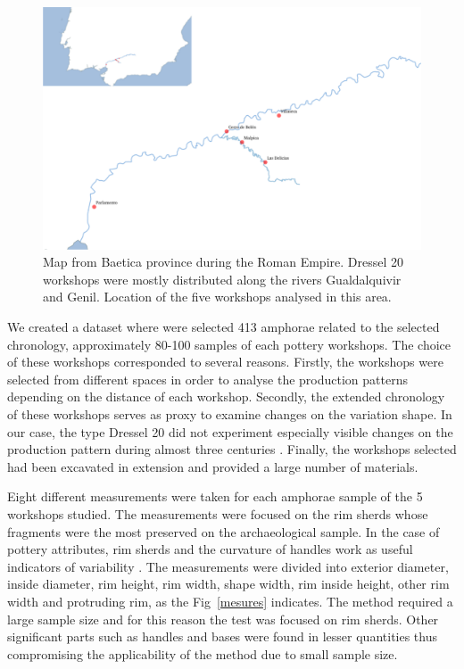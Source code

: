 \documentclass[review]{elsarticle}
\begin{document}
\begin{figure}[htp]
	\centering
\includegraphics[scale=0.30]{romanworkshop.pdf}
\caption{Map from Baetica province during the Roman Empire. Dressel 20 workshops were mostly distributed along the rivers Gualdalquivir and Genil. Location of the five workshops analysed in this area.}
\label{romanworkshop}
\end{figure} 

We created a dataset where were selected 413 amphorae related to the selected chronology, approximately 80-100 samples of each pottery workshops. The choice of these workshops corresponded to several reasons. Firstly, the workshops were selected from different spaces in order to analyse the production patterns depending on the distance of each workshop. Secondly, the extended chronology of these workshops serves as proxy to examine changes on the variation shape. In our case, the type Dressel 20 did not experiment especially visible changes on the production pattern during almost three centuries \citep{berni_dressel_2016}. Finally, the workshops selected had been excavated in extension and provided a large number of materials.   

Eight different measurements were taken for each amphorae sample of the 5 workshops studied. The measurements were focused on the rim sherds whose fragments were the most preserved on the archaeological sample. In the case of pottery attributes, rim sherds and the curvature of handles work as useful indicators of variability \citep{berni_millet_epigrafianforica_2008}. The measurements were divided into exterior diameter, inside diameter, rim height, rim width, shape width, rim inside height, other rim width and protruding rim, as the Fig~\ref{mesures} indicates. The method required a large sample size and for this reason the test was focused on rim sherds. Other significant parts such as handles and bases were found in lesser quantities thus compromising the applicability of the method due to small sample size.
\end{document}
